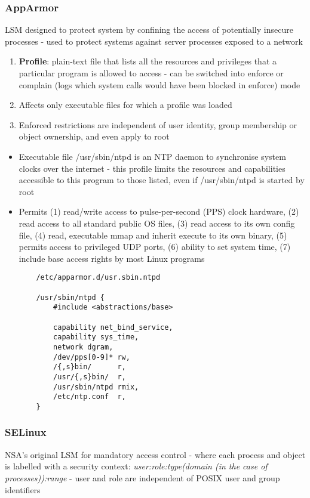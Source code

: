 \documentclass{article}
\newenvironment{example}{\par\color{brown}}{\par}
\begin{document}
\subsubsection{AppArmor}
LSM designed to protect system by confining the access of potentially insecure processes - used to protect systems against server processes exposed to a network
\begin{enumerate}
	\item \textbf{Profile}: plain-text file that lists all the resources and privileges that a particular program is allowed to access - can be switched into enforce or complain (logs which system calls would have been blocked in enforce) mode
	
	\item Affects only executable files for which a profile was loaded
	
	\item Enforced restrictions are independent of user identity, group membership or object ownership, and even apply to root
\end{enumerate}

\begin{example}
\begin{itemize}
	\item Executable file /usr/sbin/ntpd is an NTP daemon to synchronise system clocks over the internet - this profile limits the resources and capabilities accessible to this program to those listed, even if /usr/sbin/ntpd is started by root
	
	\item Permits (1) read/write access to pulse-per-second (PPS) clock hardware, (2) read access to all standard public OS files, (3) read access to its own config file, (4) read, executable mmap and inherit execute to its own binary, (5) permits access to privileged UDP ports, (6) ability to set system time, (7) include base access rights by most Linux programs	
	\begin{lstlisting}
	/etc/apparmor.d/usr.sbin.ntpd
	
	/usr/sbin/ntpd {
		#include <abstractions/base>
		
		capability net_bind_service,
		capability sys_time,
		network dgram,
		/dev/pps[0-9]* rw,
		/{,s}bin/      r,
		/usr/{,s}bin/  r,
		/usr/sbin/ntpd rmix,
		/etc/ntp.conf  r,
	}
	\end{lstlisting}
\end{itemize}
\end{example}


\subsubsection{SELinux}
NSA's original LSM for mandatory access control - where each process and object is labelled with a security context: \textit{user:role:type(domain (in the case of processes)):range} - user and role are independent of POSIX user and group identifiers
\end{document}
